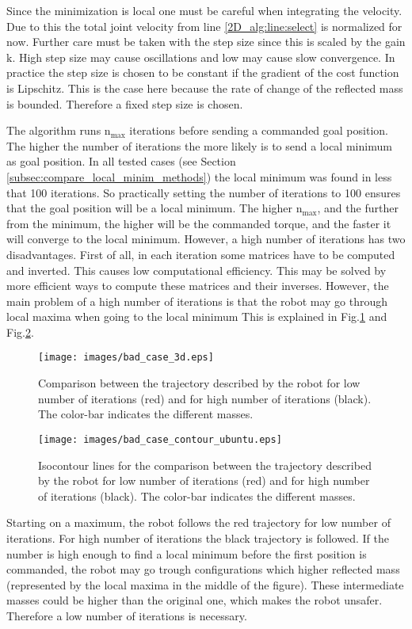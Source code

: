 Since the minimization is local one must be careful when integrating the velocity. Due to this the total joint velocity from  line \ref{2D_alg:line:select} is normalized for now. Further care must be taken with the step size since this is scaled by the gain $\mathrm{k}$. High step size may cause oscillations and low may cause slow convergence.  In practice the step size is chosen to be constant if the gradient of the cost function is Lipschitz. This is the case here because the rate of change of the reflected mass is bounded. Therefore a fixed step size is chosen.

The algorithm runs $\mathrm{n_{max}}$ iterations before sending a commanded goal position. 
The higher the number of iterations the more likely is to send a local minimum as goal position. In all tested cases (see Section   \ref{subsec:compare_local_minim_methods})  the local minimum was found in less that 100 iterations. So practically setting the number of iterations to 100 ensures that the goal position will be a local minimum. The higher $\mathrm{n_{max}}$, and the further from the minimum, the higher will be the commanded torque, and the faster it will converge to the local minimum.
However, a high number of iterations has two disadvantages. First of all, in each iteration some matrices have to be computed and inverted. This causes low computational efficiency. This may be solved by more efficient ways to compute these matrices and their inverses. However, the main problem of a high number of iterations is that the robot may go through local maxima when going to the local minimum This is explained in Fig.\ref{fig:bad_case_3d} and Fig.\ref{fig:bad_case_contour}.\\
%
\begin{figure}[H]
	\centerline{
		\texttt{[image: images/bad\_case\_3d.eps]}}
	\caption{Comparison between the trajectory described by the robot for low number of iterations (red) and for high number of iterations (black). The color-bar indicates the different masses.}
	\label{fig:bad_case_3d}
\end{figure}
\begin{figure}[H]
	\centerline{
		\texttt{[image: images/bad\_case\_contour\_ubuntu.eps]}}
	\caption{Isocontour lines for the comparison between the trajectory described by the robot for low number of iterations (red) and for high number of iterations (black). The color-bar indicates the different masses.}
	\label{fig:bad_case_contour}
\end{figure}
%
Starting on a maximum, the robot  follows the red trajectory for low number of iterations. For high number of iterations the black trajectory is followed. If the number is high enough to find a local minimum before the first position is commanded, the robot may go trough configurations which higher reflected mass (represented by the local maxima in the middle of the figure). These intermediate masses could be higher than the original one, which makes the robot unsafer. Therefore a low number of iterations is necessary.
